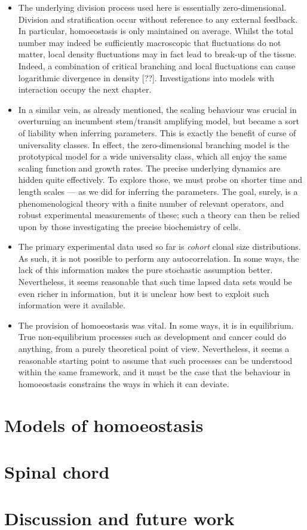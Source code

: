 \documentclass[10pt,english]{report}
\begin{document}
\begin{itemize}
\item The underlying division process used here is essentially zero-dimensional. Division and stratification occur without reference to any external feedback. In particular, homoeostasis is only maintained on average. Whilst the total number may indeed be sufficiently macroscopic that fluctuations do not matter, local density fluctuations may in fact lead to break-up of the tissue. Indeed, a combination of critical branching and local fluctuations can cause logarithmic divergence in density [??]. Investigations into models with interaction occupy the next chapter.

\item In a similar vein, as already mentioned, the scaling behaviour was crucial in overturning an incumbent stem/transit amplifying model, but became a sort of liability when inferring parameters. This is exactly the benefit of curse of universality classes. In effect, the zero-dimensional branching model is the prototypical model for a wide universality class, which all enjoy the same scaling function and growth rates. The precise underlying dynamics are hidden quite effectively. To explore those, we must probe on shorter time and length scales --- as we did for inferring the parameters. The goal, surely, is a phenomenological theory with a finite number of relevant operators, and robust experimental measurements of these; such a theory can then be relied upon by those investigating the precise biochemistry of cells.

\item The primary experimental data used so far is \emph{cohort} clonal size distributions. As such, it is not possible to perform any autocorrelation. In some ways, the lack of this information makes the pure stochastic assumption better. Nevertheless, it seems reasonable that such time lapsed data sets would be even richer in information, but it is unclear how best to exploit such information were it available.

\item The provision of homoeostasis was vital. In some ways, it is in equilibrium. True non-equilibrium processes such as development and cancer could do anything, from a purely theoretical point of view. Nevertheless, it seems a reasonable starting point to assume that such processes can be understood within the same framework, and it must be the case that the behaviour in homoeostasis constrains the ways in which it can deviate.

\end{itemize}

\chapter{Models of homoeostasis}



\chapter{Spinal chord}

\chapter{Discussion and future work}


\newpage
{}
\renewcommand\bibname{References}


\end{document}
